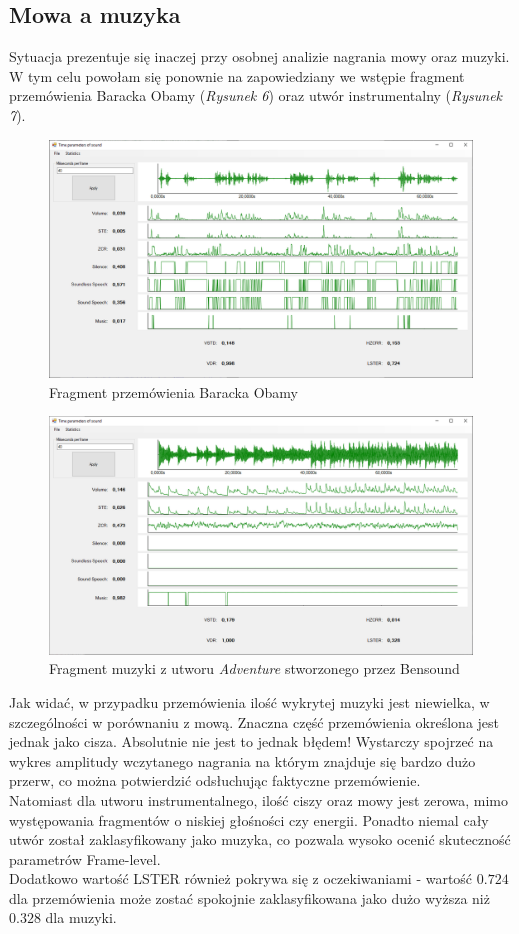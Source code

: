 \documentclass[a4paper]{article}
\begin{document}
\subsection{Mowa a muzyka}
Sytuacja prezentuje się inaczej przy osobnej analizie nagrania mowy oraz muzyki. W tym celu powołam się ponownie na zapowiedziany we wstępie fragment przemówienia Baracka Obamy (\textit{Rysunek 6}) oraz utwór instrumentalny (\textit{Rysunek 7}).
\begin{figure}[H]
  \includegraphics[width=\linewidth]{images/06sampleSpeech.png}
  \caption{Fragment przemówienia Baracka Obamy}
\end{figure}
\begin{figure}[H]
  \includegraphics[width=\linewidth]{images/07sampleMusic.png}
  \caption{Fragment muzyki z utworu \textit{Adventure} stworzonego przez Bensound}
\end{figure}
Jak widać, w przypadku przemówienia ilość wykrytej muzyki jest niewielka, w szczególności w porównaniu z mową. Znaczna część przemówienia określona jest jednak jako cisza. Absolutnie nie jest to jednak błędem! Wystarczy spojrzeć na wykres amplitudy wczytanego nagrania na którym znajduje się bardzo dużo przerw, co można potwierdzić odsłuchując faktyczne przemówienie.\\
Natomiast dla utworu instrumentalnego, ilość ciszy oraz mowy jest zerowa, mimo występowania fragmentów o niskiej głośności czy energii. Ponadto niemal cały utwór został zaklasyfikowany jako muzyka, co pozwala wysoko ocenić skuteczność parametrów Frame-level.\\
Dodatkowo wartość LSTER również pokrywa się z oczekiwaniami - wartość $0.724$ dla przemówienia może zostać spokojnie zaklasyfikowana jako dużo wyższa niż $0.328$ dla muzyki.
\end{document}
